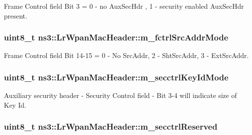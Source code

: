 Frame Control field Bit 3 = 0 -\/ no Aux\+Sec\+Hdr , 1 -\/ security enabled Aux\+Sec\+Hdr present. 

\subsubsection[{\texorpdfstring{m\+\_\+fctrl\+Src\+Addr\+Mode}{m_fctrlSrcAddrMode}}]{\setlength{\rightskip}{0pt plus 5cm}uint8\+\_\+t ns3\+::\+Lr\+Wpan\+Mac\+Header\+::m\+\_\+fctrl\+Src\+Addr\+Mode\hspace{0.3cm}{\ttfamily [private]}}\hypertarget{classns3_1_1LrWpanMacHeader_a73a10a3c6b5bacfd52fcde03bb62bba5}{}\label{classns3_1_1LrWpanMacHeader_a73a10a3c6b5bacfd52fcde03bb62bba5}


Frame Control field Bit 14-\/15 = 0 -\/ No Src\+Addr, 2 -\/ Sht\+Src\+Addr, 3 -\/ Ext\+Src\+Addr. 

\subsubsection[{\texorpdfstring{m\+\_\+secctrl\+Key\+Id\+Mode}{m_secctrlKeyIdMode}}]{\setlength{\rightskip}{0pt plus 5cm}uint8\+\_\+t ns3\+::\+Lr\+Wpan\+Mac\+Header\+::m\+\_\+secctrl\+Key\+Id\+Mode\hspace{0.3cm}{\ttfamily [private]}}\hypertarget{classns3_1_1LrWpanMacHeader_a9267670950a142f87c0b48ec4cc20236}{}\label{classns3_1_1LrWpanMacHeader_a9267670950a142f87c0b48ec4cc20236}


Auxiliary security header -\/ Security Control field -\/ Bit 3-\/4 will indicate size of Key Id. 

\subsubsection[{\texorpdfstring{m\+\_\+secctrl\+Reserved}{m_secctrlReserved}}]{\setlength{\rightskip}{0pt plus 5cm}uint8\+\_\+t ns3\+::\+Lr\+Wpan\+Mac\+Header\+::m\+\_\+secctrl\+Reserved\hspace{0.3cm}{\ttfamily [private]}}\hypertarget{classns3_1_1LrWpanMacHeader_a22584b58f0abc5d1aebe29cb020a7189}{}\label{classns3_1_1LrWpanMacHeader_a22584b58f0abc5d1aebe29cb020a7189}


